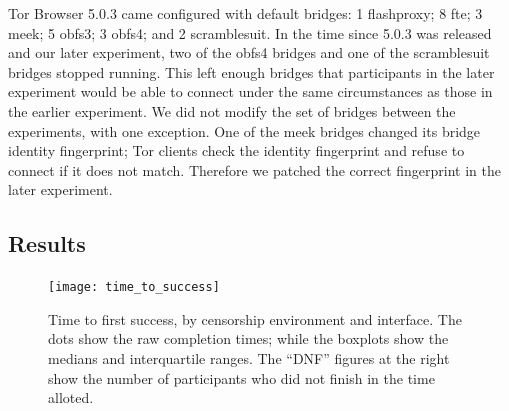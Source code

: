 \documentclass[USenglish,oneside,twocolumn]{article}
\begin{document}
Tor Browser 5.0.3 came configured with default bridges:
1 flashproxy;
8 fte;
3 meek;
5 obfs3;
3 obfs4;
and 2 scramblesuit.
In the time since 5.0.3 was released and our later experiment,
two of the obfs4 bridges and one of the scramblesuit bridges stopped running.
This left enough bridges that participants in the later experiment would be able to connect
under the same circumstances as those in the earlier experiment.
We did not modify the set of bridges between the experiments,
with one exception.
One of the meek bridges changed its bridge identity fingerprint;
Tor clients check the identity fingerprint and refuse to connect
if it does not match.
Therefore we patched the correct fingerprint in the later experiment.

\subsection{Results} 

\begin{figure}
\centering
\texttt{[image: time\_to\_success]}
\caption{
Time to first success, by censorship environment and interface.
The dots show the raw completion times;
while the boxplots show the medians and interquartile ranges.
The ``DNF'' figures at the right
show the number of participants who did not finish
in the time alloted.
}
\label{fig:time_to_success}
\end{figure}
\end{document}
